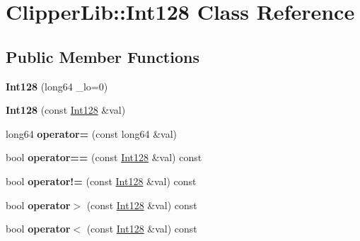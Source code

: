\hypertarget{class_clipper_lib_1_1_int128}{\section{Clipper\+Lib\+:\+:Int128 Class Reference}
\label{class_clipper_lib_1_1_int128}
}
\subsection*{Public Member Functions}
\begin{DoxyCompactItemize}
\item 
\hypertarget{class_clipper_lib_1_1_int128_acb7953a56e0ddb6d3245268e457f9e37}{{\bfseries Int128} (long64 \+\_\+lo=0)}\label{class_clipper_lib_1_1_int128_acb7953a56e0ddb6d3245268e457f9e37}

\item 
\hypertarget{class_clipper_lib_1_1_int128_ad113c3dc3bd371984b05fddb1fe527e2}{{\bfseries Int128} (const \hyperlink{class_clipper_lib_1_1_int128}{Int128} \&val)}\label{class_clipper_lib_1_1_int128_ad113c3dc3bd371984b05fddb1fe527e2}

\item 
\hypertarget{class_clipper_lib_1_1_int128_a51ef81c338951a30c55315d43bdf2690}{long64 {\bfseries operator=} (const long64 \&val)}\label{class_clipper_lib_1_1_int128_a51ef81c338951a30c55315d43bdf2690}

\item 
\hypertarget{class_clipper_lib_1_1_int128_a9a4597562962e318616a463350c68896}{bool {\bfseries operator==} (const \hyperlink{class_clipper_lib_1_1_int128}{Int128} \&val) const }\label{class_clipper_lib_1_1_int128_a9a4597562962e318616a463350c68896}

\item 
\hypertarget{class_clipper_lib_1_1_int128_a4b79b3e28a4012f87d03fc02969796f9}{bool {\bfseries operator!=} (const \hyperlink{class_clipper_lib_1_1_int128}{Int128} \&val) const }\label{class_clipper_lib_1_1_int128_a4b79b3e28a4012f87d03fc02969796f9}

\item 
\hypertarget{class_clipper_lib_1_1_int128_af34c23b86068c7f065a76dbc1d192269}{bool {\bfseries operator$>$} (const \hyperlink{class_clipper_lib_1_1_int128}{Int128} \&val) const }\label{class_clipper_lib_1_1_int128_af34c23b86068c7f065a76dbc1d192269}

\item 
\hypertarget{class_clipper_lib_1_1_int128_a1f875f6f5357bdb031dc4ef0d058268d}{bool {\bfseries operator$<$} (const \hyperlink{class_clipper_lib_1_1_int128}{Int128} \&val) const }\label{class_clipper_lib_1_1_int128_a1f875f6f5357bdb031dc4ef0d058268d}


\end{DoxyCompactItemize}
